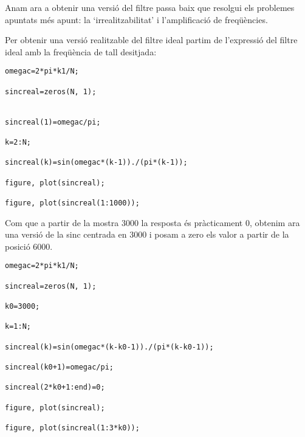 \documentclass{article}
\begin{document}
Anam ara a obtenir una versió del filtre passa baix que resolgui els problemes apuntats més apunt: la `irrealitzabilitat' i 
l'amplificació de freqüències.

%
%
%
%
%
%

Per obtenir una versió realitzable del filtre ideal partim de l'expressió del filtre ideal amb la freqüència de tall desitjada:

\begin{verbatim}
omegac=2*pi*k1/N;

sincreal=zeros(N, 1);


sincreal(1)=omegac/pi;

k=2:N;

sincreal(k)=sin(omegac*(k-1))./(pi*(k-1));

figure, plot(sincreal);

figure, plot(sincreal(1:1000));
\end{verbatim}

Com que a partir de la mostra 3000 la resposta és pràcticament 0, obtenim ara una versió de la sinc centrada en 3000
i posam a zero els valor a partir de la posició 6000.

\begin{verbatim}
omegac=2*pi*k1/N;

sincreal=zeros(N, 1);

k0=3000;

k=1:N;

sincreal(k)=sin(omegac*(k-k0-1))./(pi*(k-k0-1));

sincreal(k0+1)=omegac/pi;

sincreal(2*k0+1:end)=0;

figure, plot(sincreal);

figure, plot(sincreal(1:3*k0));
\end{verbatim}
\end{document}
